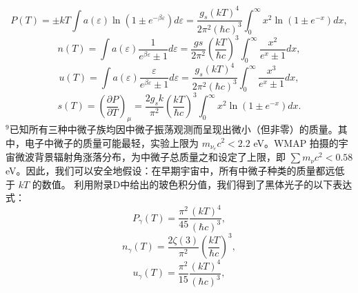 \begin{equation}\tag{9.3.3}\label{eq:9.3.3}
P ( T ) = \pm k T \int a ( \varepsilon ) \ln ( 1 \pm e ^{- \beta \varepsilon} ) d \varepsilon = \frac { g _ { s } \left( k T \right) ^{4} } { 2 \pi ^{2} \left( \hbar c \right) ^{3} } \int _ { 0 } ^{\infty} x ^{2} \ln \left( 1 \pm e ^{- x} \right) d x ,
\end{equation}
\begin{equation}\tag{9.3.4}\label{eq:9.3.4}
n ( T ) = \int a ( \varepsilon ) \frac { 1 } { e ^{\beta \varepsilon} \pm 1 } d \varepsilon = \frac { g s } { 2 \pi ^{2} } \left( \frac { k T } { \hbar c } \right) ^{3} \int _ { 0 } ^{\infty} \frac { x ^{2} } { e ^{x} \pm 1 } d x ,
\end{equation}
\begin{equation}\tag{9.3.5}\label{eq:9.3.5}
u ( T ) = \int a ( \varepsilon ) \frac { \varepsilon } { e ^{\beta \varepsilon} \pm 1 } d \varepsilon = \frac { g _ { s } \left( k T \right) ^{4} } { 2 \pi ^{2} \left( \hbar c \right) ^{3} } \int _ { 0 } ^{\infty} \frac { x ^{3} } { e ^{x} \pm 1 } d x ,
\end{equation}
\begin{equation}\tag{9.3.6}\label{eq:9.3.6}
s ( T ) = \left( \frac { \partial P } { \partial T } \right) _ { \mu } = \frac { 2 g _ { s } k } { \pi ^{2} } \left( \frac { k T } { \hbar c } \right) ^{3} \int _ { 0 } ^{\infty} x ^{2} \ln \left( 1 \pm e ^{- x} \right) d x .
\end{equation}
\(^{9}\)已知所有三种中微子族均因中微子振荡观测而呈现出微小（但非零）的质量。其中，电子中微子的质量可能最轻，实验上限为 \(m_{\nu_{e}}c^{2}<2.2\) eV。WMAP 拍摄的宇宙微波背景辐射角涨落分布，为中微子总质量之和设定了上限，即 \(\sum m_{\nu}c^{2}<0.58\) eV。因此，我们可以安全地假设：在早期宇宙中，所有中微子种类的质量都远低于 \(kT\) 的数值。
利用附录D中给出的玻色积分值，我们得到了黑体光子的以下表达式：
\begin{equation}\tag{9.3.7}\label{eq:9.3.7}
P _ { \gamma } ( T ) = \frac { \pi ^{2} } { 45 } \frac { ( k T ) ^{4} } { ( \hbar c ) ^{3} } ,
\end{equation}
\begin{equation}\tag{9.3.8}\label{eq:9.3.8}
n _ { \gamma } ( T ) = \frac { 2 \zeta ( 3 ) } { \pi ^{2} } \left( \frac { k T } { \hbar c } \right) ^{3} ,
\end{equation}
\begin{equation}\tag{9.3.9}\label{eq:9.3.9}
u _ { \gamma } ( T ) = \frac { \pi ^{2} } { 15 } \frac { ( k T ) ^{4} } { ( \hbar c ) ^{3} } ,
\end{equation}
